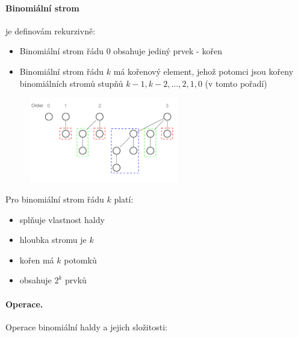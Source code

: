 \paragraph{Binomiální strom} je definovám rekurzivně:

\begin{itemize}[itemsep=0pt, topsep=2pt]
    \item Binomiální strom řádu 0 obsahuje jediný prvek - kořen
    \item Binomiální strom řádu $k$ má kořenový element, jehož potomci jsou kořeny binomiálních stromů stupňů $k-1, k-2, \hdots, 2, 1, 0$ (v tomto pořadí)
\end{itemize}

\begin{figure}
    \vspace{-20px}
    \begin{center}
        \includegraphics[width=65mm]{01/images/Binomial_Trees}
    \end{center}
    \vspace{-30pt}
    \label{fig:binom_heap}
    \vspace{-60pt}
\end{figure}

\noindent Pro binomiální strom řádu $k$ platí:

\begin{itemize}[itemsep=0pt, topsep=2pt]
    \item splňuje vlastnost haldy
    \item hloubka stromu je $k$
    \item kořen má $k$ potomků
    \item obsahuje $2^k$ prvků
\end{itemize}

\paragraph{Operace.} Operace binomiální haldy a jejich složitosti:

